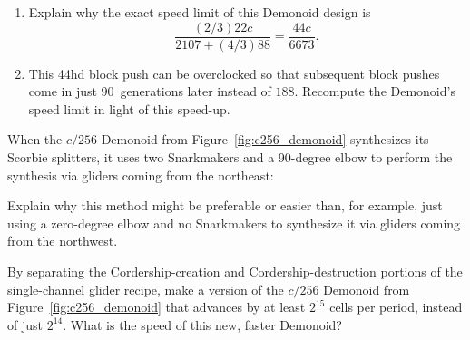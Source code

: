 \begin{multicols}{2}
\begin{problemstar}
\begin{enumerate}[label=\bf\color{ocre}(\alph*)]
			\item Explain why the exact speed limit of this Demonoid design is
			\[
			\frac{(2/3)22c}{2107 + (4/3)88} = \frac{44c}{6673}.
			\]
			
			
			\item This 44hd block push can be overclocked so that subsequent block pushes come in just $90$~generations later instead of $188$. Recompute the Demonoid's speed limit in light of this speed-up.
		\end{enumerate}
	\end{problemstar}
	
	
	\mfilbreak
	
	
	\begin{problemstar}\label{exer:why_scorbie_splitter_snarkmakers} 
		When the $c/256$ Demonoid from Figure~\ref{fig:c256_demonoid} synthesizes its Scorbie splitters, it uses two Snarkmakers and a 90-degree elbow to perform the synthesis via gliders coming from the northeast:
		
		\noindent\begin{center}
		\end{center}
		
		\noindent Explain why this method might be preferable or easier than, for example, just using a zero-degree elbow and no Snarkmakers to synthesize it via gliders coming from the northwest.
	\end{problemstar}
	
	
	\mfilbreak
	
	
	\begin{problem}\label{exer:middling_demonoid_faster} 
		By separating the Cordership-creation and Cordership-destruction portions of the single-channel glider recipe, make a version of the $c/256$ Demonoid from Figure~\ref{fig:c256_demonoid} that advances by at least $2^{15}$ cells per period, instead of just $2^{14}$. What is the speed of this new, faster Demonoid?
		
	\end{problem}
	

\end{multicols}
